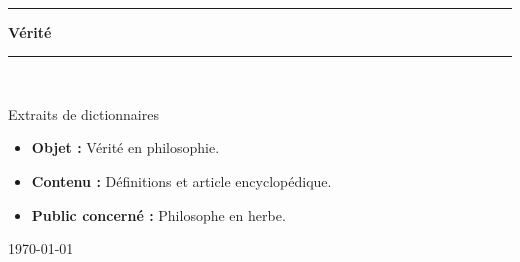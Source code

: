 \begin{titlepage}
%
\newcommand{\HRule}{\rule{\linewidth}{0.5mm}}

\begin{center}
\hspace{1cm}
\end{center}

\textsc{\Large }\\[0.5cm]

\HRule

\begin{center}
{\Huge \bfseries  Vérité }
\end{center}

\HRule \\[1.5cm]


\vfill

\begin{flushright} \huge
Extraits de dictionnaires
\end{flushright}

\vfill
{\sf
\begin{itemize}[leftmargin=1cm, label=, itemsep=1pt]
\item {\bf Objet : } Vérité en philosophie.
\item {\bf Contenu : } Définitions et article encyclopédique.
\item {\bf Public concerné : } Philosophe en herbe.
\end{itemize}
}

\vfill

{\large \today}

\end{titlepage}
